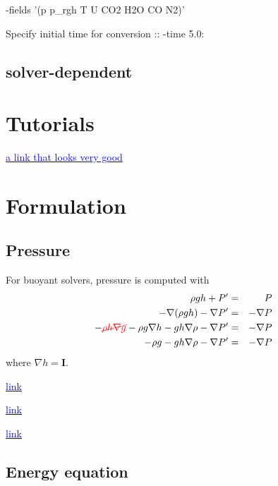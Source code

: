 \documentclass[a4paper, 12pt]{article}
\numberwithin{equation}{section}
\newcommand{\code}{\fontfamily{pcr}\selectfont}
\newcommand{\blue}[1]{\textcolor{blue}{#1}}
\newcommand{\red}[1]{\textcolor{red}{#1}}
\begin{document}
        {\code -fields '(p p\_rgh T U CO2 H2O CO N2)'}

        Specify initial time for conversion :: {\code -time 5.0:}

    \subsection{solver-dependent}

\clearpage
\section{Tutorials}

    \href{https://www.cfdyna.com/Home/of_Programming.html}{\blue{a link that looks very good}}

\clearpage
\section{Formulation}

    \subsection{Pressure}

        For buoyant solvers, pressure is computed with
        \begin{eqnarray}
        \rho g h + P' &=& P \\
        - \nabla(\rho g h) - \nabla P' &=& - \nabla P \\
        - \red{\cancel{\rho h \nabla g}} - \rho g \nabla h - g h \nabla \rho - \nabla P' &=& - \nabla P \\
        - \rho g - g h \nabla \rho - \nabla P' &=& - \nabla P
        \end{eqnarray}
        where $\nabla h = \mathbf{I}$.

        \href{
        https://www.cfd-online.com/Forums/openfoam-solving/219609-rho-buoyant-solver-p-p\_rgh-ph\_rgh.html
        }{\blue{link}}

        \href{
        https://www.openfoam.com/documentation/guides/latest/api/prghTotalHydrostaticPressureFvPatchScalarField\_8H\_source.html
        }{\blue{link}}

        \href{
        https://www.openfoam.com/documentation/guides/latest/api/classFoam\_1\_1prghTotalHydrostaticPressureFvPatchScalarField.html
        }{\blue{link}}

    \subsection{Energy equation}
\end{document}

